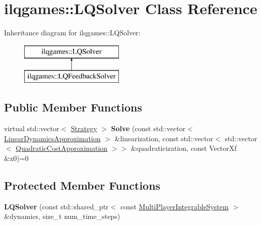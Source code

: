 \hypertarget{classilqgames_1_1_l_q_solver}{}\section{ilqgames\+:\+:L\+Q\+Solver Class Reference}
\label{classilqgames_1_1_l_q_solver}
Inheritance diagram for ilqgames\+:\+:L\+Q\+Solver\+:\begin{figure}[H]
\begin{center}
\leavevmode
\includegraphics[height=1.996435cm]{classilqgames_1_1_l_q_solver}
\end{center}
\end{figure}
\subsection*{Public Member Functions}
\begin{DoxyCompactItemize}
\item 
virtual std\+::vector$<$ \hyperlink{structilqgames_1_1_strategy}{Strategy} $>$ {\bfseries Solve} (const std\+::vector$<$ \hyperlink{structilqgames_1_1_linear_dynamics_approximation}{Linear\+Dynamics\+Approximation} $>$ \&linearization, const std\+::vector$<$ std\+::vector$<$ \hyperlink{structilqgames_1_1_quadratic_cost_approximation}{Quadratic\+Cost\+Approximation} $>$$>$ \&quadraticization, const Vector\+Xf \&x0)=0\hypertarget{classilqgames_1_1_l_q_solver_ab40242e2a6e8f0749dfa3b9f450ebed0}{}\label{classilqgames_1_1_l_q_solver_ab40242e2a6e8f0749dfa3b9f450ebed0}

\end{DoxyCompactItemize}
\subsection*{Protected Member Functions}
\begin{DoxyCompactItemize}
\item 
{\bfseries L\+Q\+Solver} (const std\+::shared\+\_\+ptr$<$ const \hyperlink{classilqgames_1_1_multi_player_integrable_system}{Multi\+Player\+Integrable\+System} $>$ \&dynamics, size\+\_\+t num\+\_\+time\+\_\+steps)\hypertarget{classilqgames_1_1_l_q_solver_a0f96c7942e604bb26c68a48b2cb9dbc8}{}\label{classilqgames_1_1_l_q_solver_a0f96c7942e604bb26c68a48b2cb9dbc8}

\end{DoxyCompactItemize}
